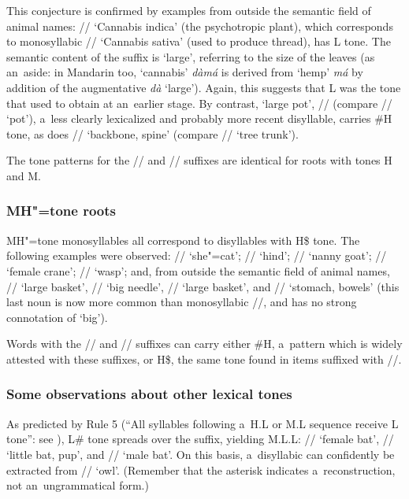 	This conjecture is confirmed by examples from outside the semantic field of animal names:
	// ‘Cannabis indica’ (the psychotropic plant), which corresponds to monosyllabic //
	‘Cannabis sativa’ (used to produce thread), has L tone. The semantic content of the suffix is
	‘large’, referring to the size of the leaves (as an~aside: in {Mandarin} too, ‘cannabis’ \textit{dàmá}  is derived from ‘hemp’ \textit{má}  by addition of the augmentative \textit{dà}  ‘large’). Again, this suggests that L was the tone that used to obtain at an~earlier stage. By
	contrast, ‘large pot’, // (compare // ‘pot’), a~less clearly lexicalized and probably more recent
	disyllable, carries \#H tone, as does // ‘backbone, spine’ (compare //
	‘tree trunk’).
	
	The tone patterns for the // and // suffixes are identical for roots with tones H
	and M.
	
	
	\subsubsection{MH"=tone roots}
	\label{sec:mhtoneroots}
	
	MH"=tone monosyllables all correspond to disyllables with H\$ tone. The following examples were
	observed: // ‘she"=cat’; // ‘hind’; // ‘nanny goat’;
	// ‘female crane’; // ‘wasp’; and, from outside the semantic field of
	animal names, // ‘large basket’, // ‘big needle’, //
	‘large basket’, and // ‘stomach, bowels’ (this last noun is now more common than monosyllabic
	//, and has no strong connotation of ‘big’).
	
	Words with the // and // suffixes can carry either \#H, a~pattern which is widely
	attested with these suffixes, or H\$, the same tone found in items suffixed with //.
	
	\subsubsection{Some observations about other lexical tones}
	\label{sec:someobservationsaboutotherlexicaltones}
	
	As predicted by Rule 5 (“All syllables following a~H.L or
	M.L sequence receive L tone”: see ), L\# tone spreads over the {suffix}, yielding M.L.L:
	// ‘female bat’, // ‘little bat, pup’, and //
	‘male bat’. On this basis, a~disyllabic  can confidently be extracted from
	// ‘owl’. (Remember that the asterisk indicates a~reconstruction, not an~ungrammatical form.)
	
